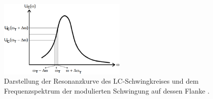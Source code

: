 \begin{figure}
    \centering
    \includegraphics[width=0.55\textwidth]{ressources/A8.png}
    \caption{Darstellung der Resonanzkurve des LC-Schwingkreises und dem Frequenzspektrum der modulierten Schwingung auf dessen Flanke \cite{skript}.}
    \label{fig_08}
\end{figure}
